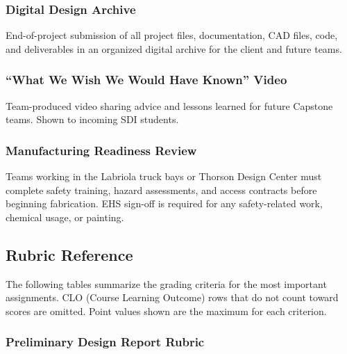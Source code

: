 \subsubsection{Digital Design Archive}
\label{sssec:archive}

End-of-project submission of all project files, documentation, CAD files, code, and deliverables in an organized digital archive for the client and future teams.

\subsubsection{``What We Wish We Would Have Known'' Video}
\label{sssec:wish-video}

Team-produced video sharing advice and lessons learned for future Capstone teams. Shown to incoming SDI students.

\subsubsection{Manufacturing Readiness Review}
\label{sssec:mrr}

Teams working in the Labriola truck bays or Thorson Design Center must complete safety training, hazard assessments, and access contracts before beginning fabrication. EHS sign-off is required for any safety-related work, chemical usage, or painting.


\subsection{Rubric Reference}
\label{subsec:rubric-reference}

The following tables summarize the grading criteria for the most important assignments. CLO (Course Learning Outcome) rows that do not count toward scores are omitted. Point values shown are the maximum for each criterion.

\subsubsection{Preliminary Design Report Rubric}
\label{sssec:rubric-pdr-report}


